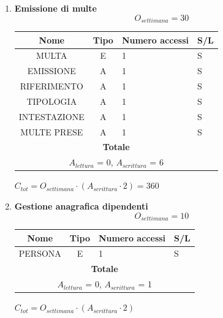 \documentclass[12pt,a4paper]{report}
\begin{document}
\begin{enumerate}[label=\textbf{\arabic*)}]
    \item \textbf{Emissione di multe} \\
    \[ {O_{settimana} = 30} \]
    \begin{table}[H]
    \centering
    \begin{tabular}{|c|c|l|l|}
    \hline
    \textbf{Nome} & \textbf{Tipo} & \textbf{Numero accessi} & \textbf{S/L} \\
    \hline
    MULTA & E & 1 & S \\
    \hline
    EMISSIONE & A & 1 & S \\
    \hline
    RIFERIMENTO & A & 1 & S \\
    \hline
    TIPOLOGIA & A & 1 & S \\
    \hline
    INTESTAZIONE & A & 1 & S \\
    \hline
    MULTE PRESE & A & 1 & S \\
    \hline
    \multicolumn{4}{c}{\textbf{Totale}} \\    
    \multicolumn{4}{c}{${A_{lettura}}$ = 0, ${A_{scrittura}}$ = 6} \\
    \hline
    \end{tabular}
    \end{table}
    \begin{center}
    ${C_{tot} = {O_{settimana}}\cdot({A_{scrittura}}\cdot 2) = 360}$
    \end{center}

    \item \textbf{Gestione anagrafica dipendenti} \\
    \[ {O_{settimana} = 10} \]
    \begin{table}[H]
    \centering
    \begin{tabular}{|c|c|l|l|}
    \hline
    \textbf{Nome} & \textbf{Tipo} & \textbf{Numero accessi} & \textbf{S/L} \\
    \hline
    PERSONA & E & 1 & S \\
    \hline
    \multicolumn{4}{c}{\textbf{Totale}} \\    
    \multicolumn{4}{c}{${A_{lettura}}$ = 0, ${A_{scrittura}}$ = 1} \\
    \hline
    \end{tabular}
    \end{table}
    \begin{center}
    ${C_{tot} = {O_{settimana}}\cdot({A_{scrittura}}\cdot 2)}$
    \end{center}


\end{enumerate}
\end{document}
